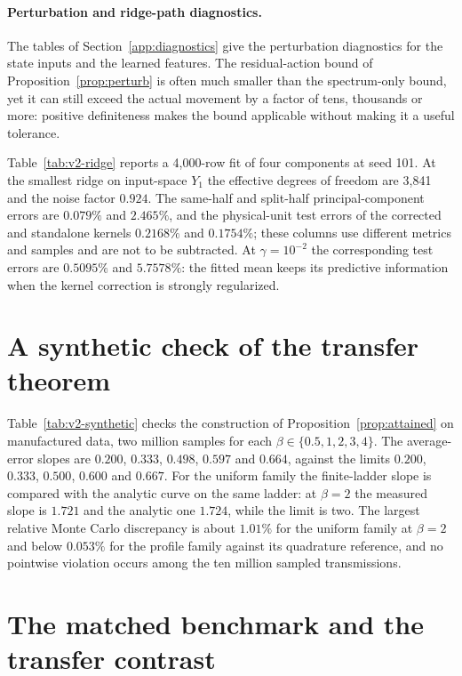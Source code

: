 \paragraph{Perturbation and ridge-path diagnostics.}
The tables of Section~\ref{app:diagnostics} give the perturbation diagnostics for the state
inputs and the learned features. The residual-action bound of Proposition~\ref{prop:perturb} is
often much smaller than the spectrum-only bound, yet it can still exceed the actual movement by a
factor of tens, thousands or more: positive definiteness makes the bound applicable without
making it a useful tolerance.

Table~\ref{tab:v2-ridge} reports a 4{,}000-row fit of four components at seed 101. At the
smallest ridge on input-space $Y_1$ the effective degrees of freedom are 3{,}841 and the noise
factor $0.924$. The same-half and split-half principal-component errors are $0.079\%$ and
$2.465\%$, and the physical-unit test errors of the corrected and standalone kernels $0.2168\%$
and $0.1754\%$; these columns use different metrics and samples and are not to be subtracted. At
$\gamma=10^{-2}$ the corresponding test errors are $0.5095\%$ and $5.7578\%$: the fitted mean
keeps its predictive information when the kernel correction is strongly regularized.

\section{A synthetic check of the transfer theorem}\label{sec:results-synthetic}

Table~\ref{tab:v2-synthetic} checks the construction of Proposition~\ref{prop:attained} on
manufactured data, two million samples for each $\beta\in\{0.5,1,2,3,4\}$. The average-error
slopes are $0.200$, $0.333$, $0.498$, $0.597$ and $0.664$, against the limits $0.200$, $0.333$,
$0.500$, $0.600$ and $0.667$. For the uniform family the finite-ladder slope is compared with the
analytic curve on the same ladder: at $\beta=2$ the measured slope is $1.721$ and the analytic one
$1.724$, while the limit is two. The largest relative Monte Carlo discrepancy is about $1.01\%$ for
the uniform family at $\beta=2$ and below $0.053\%$ for the profile family against its quadrature
reference, and no pointwise violation occurs among the ten million sampled transmissions.

\section{The matched benchmark and the transfer contrast}\label{sec:results-benchmarks}

